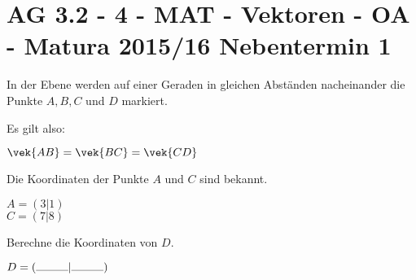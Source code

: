 \section{AG 3.2 - 4 - MAT - Vektoren - OA - Matura 2015/16 Nebentermin 1}

\begin{beispiel}[AG 3.2]{1} %
In der Ebene werden auf einer Geraden in gleichen Abständen nacheinander die Punkte $A,B,C$ und $D$ markiert.

Es gilt also:

$\vek{AB}=\vek{BC}=\vek{CD}$

Die Koordinaten der Punkte $A$ und $C$ sind bekannt.

$A=(3|1)$ \\
$C=(7|8)$ 

Berechne die Koordinaten von $D$.\leer

$D=(\rule{1cm}{0.3pt}|\rule{1cm}{0.3pt})$

\end{beispiel}